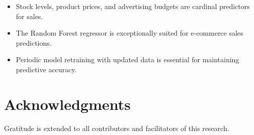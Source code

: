 \documentclass{article}
\begin{document}
\begin{itemize}
    \item Stock levels, product prices, and advertising budgets are cardinal predictors for sales.
    \item The Random Forest regressor is exceptionally suited for e-commerce sales predictions.
    \item Periodic model retraining with updated data is essential for maintaining predictive accuracy.
\end{itemize}

\section{Acknowledgments}
Gratitude is extended to all contributors and facilitators of this research.
\end{document}
